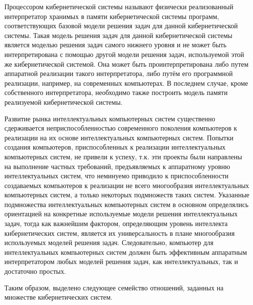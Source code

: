 
Процессором кибернетической системы называют физически реализованный интерпретатор хранимых в памяти кибернетической системы программ, соответствующих базовой модели решения задач для данной кибернетической системы. Такая модель решения задач для данной кибернетической системы является моделью решения задач самого нижнего уровня и не может быть интерпретирована с помощью другой модели решения задач, используемой этой же кибернетической системой. Она может быть проинтерпретирована либо путем аппаратной реализации такого интерпретатора, либо путём его программной реализации, например, на современных компьютерах. В последнем случае, кроме собственного интерпретатора, необходимо также построить модель памяти реализуемой кибернетической системы.

Развитие рынка интеллектуальных компьютерных систем существенно сдерживается неприспособленностью современного поколения компьютеров к реализации на их основе интеллектуальных компьютерных систем. Попытки создания компьютеров, приспособленных к реализации интеллектуальных компьютерных систем, не привели к успеху, т.к. эти проекты были направлены на выполнение частных требований, предъявляемых к аппаратному уровню интеллектуальных систем, что неминуемо приводило к приспособленности создаваемых компьютеров к реализации не всего многообразия интеллектуальных компьютерных систем, а только некоторых подмножеств таких систем. Указанные подмножества интеллектуальных компьютерных систем в основном определялись ориентацией на конкретные используемые модели решения интеллектуальных задач, тогда как важнейшим фактором, определяющим уровень интеллекта кибернетических систем, является их универсальность в плане многообразия используемых моделей решения задач. Следовательно, компьютер для интеллектуальных компьютерных систем должен быть эффективным аппаратным интерпретатором любых моделей решения задач, как интеллектуальных, так и достаточно простых.

Таким образом, выделено следующее семейство отношений, заданных на множестве кибернетических систем.

\begin{SCn}
\begin{scnindent}
\end{scnindent}
\end{SCn}

